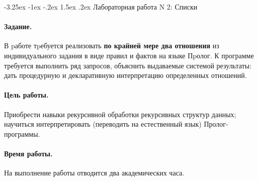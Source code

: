 \documentclass[12pt, openany, twoside]{book} %
\makeatletter
\renewcommand\section{\@startsection {section}{1}{\z@}%
                                   {-3.25ex \@plus -1ex \@minus -.2ex}%
                                   {1.5ex \@plus.2ex}%
                                   {\normalfont\large\bfseries}}
\makeatother
\begin{document}
\section{Лабораторная работа N 2: Списки}

\paragraph{Задание.} В pаботе тpебуется реализовать {\bf по крайней мере два отношения} из индивидуального задания в виде правил и фактов на языке Пpолог. К программе требуется выполнить ряд запросов, объяснить выдаваемые системой результаты: дать процедурную и декларативную интерпретацию определенных отношений.

\paragraph{Цель работы.} Приобрести навыки рекурсивной обработки рекурсивных структур данных; научиться интерпретировать (переводить на естественный язык) Пролог-программы.

\paragraph{Время работы.} На выполнение работы отводится два академических часа.
\end{document}
